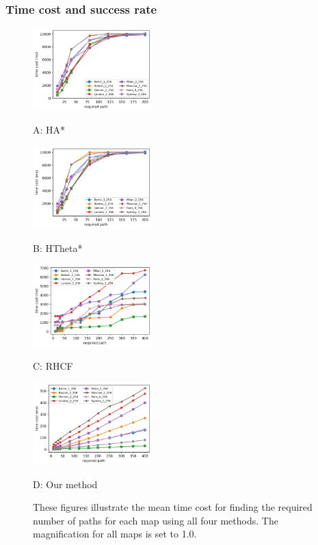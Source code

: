 \documentclass[letterpaper, 10 pt, journal, twoside]{IEEEtran}
\begin{document}
\subsubsection{Time cost and success rate}

\begin{figure}[t] \scriptsize
\begin{minipage}{.245\linewidth}
  \centerline{\includegraphics[width=4.6cm]{HsAs_time_and_count.png}}
  \centerline{A: HA*}
\end{minipage}
\hfill
\begin{minipage}{.245\linewidth}
  \centerline{\includegraphics[width=4.6cm]{HsTs_time_and_count.png}}
  \centerline{B: HTheta*}
\end{minipage}
\hfill
\begin{minipage}{.245\linewidth}
  \centerline{\includegraphics[width=4.6cm]{RHCF_time_and_count.png}}
  \centerline{C: RHCF}
\end{minipage}
\hfill
\begin{minipage}{.245\linewidth}
  \centerline{\includegraphics[width=4.6cm]{RJ_time_and_count.png}}
  \centerline{D: Our method}
\end{minipage}
\vfill

\caption{These figures illustrate the mean time cost for finding the required number of paths for each map using all four methods. The magnification for all maps is set to 1.0.}
\label{total_time_cost_and_path_count}
\end{figure}
\end{document}
